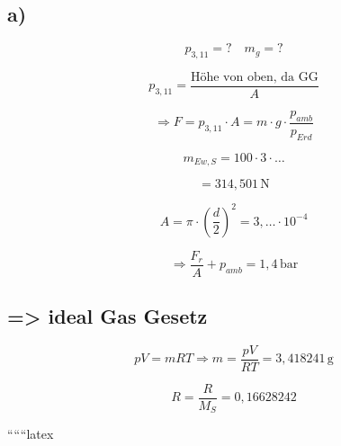 

\subsection*{a)}
\[ p_{3,11} = ? \quad m_g = ? \]

\[ p_{3,11} = \frac{\text{Höhe von oben, da GG}}{A} \]

\[
\Rightarrow F = p_{3,11} \cdot A = m \cdot g \cdot \frac{p_{amb}}{p_{Erd}} 
\]

\[ m_{Ew, S} = 100 \cdot 3 \cdot \ldots \]

\[ = 314,501 \, \text{N} \]

\[ A = \pi \cdot \left(\frac{d}{2}\right)^2 = 3, \ldots \cdot 10^{-4} \]

\[
\Rightarrow \frac{F_r}{A} + p_{amb} = 1,4 \, \text{bar}
\]

\subsection*{=> ideal Gas Gesetz}

\[
pV = mRT \Rightarrow m = \frac{pV}{RT} = 3,418241 \, \text{g}
\]

\[
R = \frac{R}{M_S} = 0,16628242
\]

``````latex